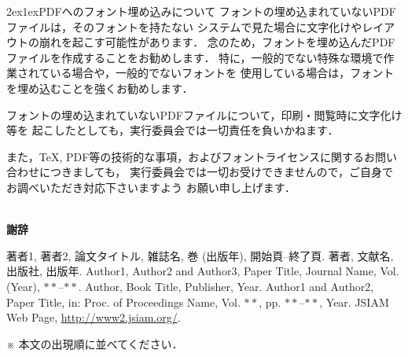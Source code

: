 \documentclass[11pt,a4j]{jarticle}
\makeatletter
\renewcommand{\section}{\@startsection{section}{1}{\z@}%
{2ex}{1ex}{\reset@font\large\bfseries}}%
\def\thanks{~\\[.5\baselineskip]{\bf 謝辞}\hspace*{1zw}}
\makeatother
\begin{document}
\section{PDFへのフォント埋め込みについて}
%
フォントの埋め込まれていないPDFファイルは，そのフォントを持たない
システムで見た場合に文字化けやレイアウトの崩れを起こす可能性があります．
念のため，フォントを埋め込んだPDFファイルを作成することをお勧めします．
特に，一般的でない特殊な環境で作業されている場合や，一般的でないフォントを
使用している場合は，フォントを埋め込むことを強くお勧めします．

フォントの埋め込まれていないPDFファイルについて，印刷・閲覧時に文字化け等を
起こしたとしても，実行委員会では一切責任を負いかねます．

また，{\TeX}, PDF等の技術的な事項，およびフォントライセンスに関するお問い合わせにつきましても，
実行委員会では一切お受けできませんので，ご自身でお調べいただき対応下さいますよう
お願い申し上げます．

\thanks
%
\dotfill \\ \dotfill
%
\begin{thebibliography}{10}
%
著者1, 著者2, 論文タイトル, 雑誌名, 巻 (出版年), 開始頁--終了頁.
%
著者, 文献名, 出版社, 出版年.
%
Author1, Author2 and Author3, Paper Title, Journal Name, Vol. (Year), $\ast\ast$--$\ast\ast$.
%
Author, Book Title, Publisher, Year.
%
Author1 and Author2, Paper Title, in: Proc. of Proceedings Name, Vol. $\ast\ast$, pp. $\ast\ast$--$\ast\ast$, Year.
%
JSIAM Web Page, \url{http://www2.jsiam.org/}.
\end{thebibliography}
※ 本文の出現順に並べてください．
%
\end{document}
